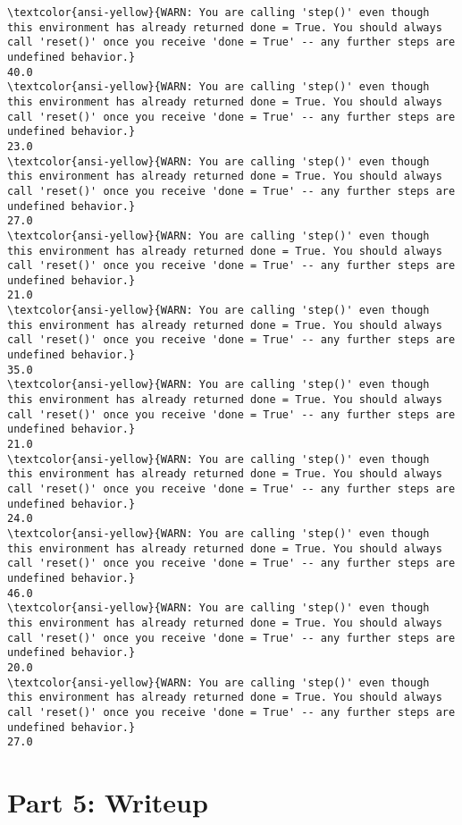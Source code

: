 \documentclass[11pt]{article}
\begin{document}
    \begin{Verbatim}[commandchars=\\\{\}]
\textcolor{ansi-yellow}{WARN: You are calling 'step()' even though this environment has already returned done = True. You should always call 'reset()' once you receive 'done = True' -- any further steps are undefined behavior.}
40.0
\textcolor{ansi-yellow}{WARN: You are calling 'step()' even though this environment has already returned done = True. You should always call 'reset()' once you receive 'done = True' -- any further steps are undefined behavior.}
23.0
\textcolor{ansi-yellow}{WARN: You are calling 'step()' even though this environment has already returned done = True. You should always call 'reset()' once you receive 'done = True' -- any further steps are undefined behavior.}
27.0
\textcolor{ansi-yellow}{WARN: You are calling 'step()' even though this environment has already returned done = True. You should always call 'reset()' once you receive 'done = True' -- any further steps are undefined behavior.}
21.0
\textcolor{ansi-yellow}{WARN: You are calling 'step()' even though this environment has already returned done = True. You should always call 'reset()' once you receive 'done = True' -- any further steps are undefined behavior.}
35.0
\textcolor{ansi-yellow}{WARN: You are calling 'step()' even though this environment has already returned done = True. You should always call 'reset()' once you receive 'done = True' -- any further steps are undefined behavior.}
21.0
\textcolor{ansi-yellow}{WARN: You are calling 'step()' even though this environment has already returned done = True. You should always call 'reset()' once you receive 'done = True' -- any further steps are undefined behavior.}
24.0
\textcolor{ansi-yellow}{WARN: You are calling 'step()' even though this environment has already returned done = True. You should always call 'reset()' once you receive 'done = True' -- any further steps are undefined behavior.}
46.0
\textcolor{ansi-yellow}{WARN: You are calling 'step()' even though this environment has already returned done = True. You should always call 'reset()' once you receive 'done = True' -- any further steps are undefined behavior.}
20.0
\textcolor{ansi-yellow}{WARN: You are calling 'step()' even though this environment has already returned done = True. You should always call 'reset()' once you receive 'done = True' -- any further steps are undefined behavior.}
27.0

    \end{Verbatim}

    \section{Part 5: Writeup}\label{part-5-writeup}
\end{document}

